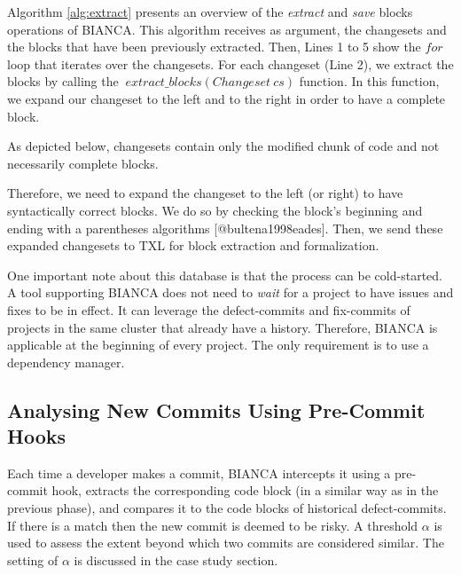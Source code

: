 

Algorithm \ref{alg:extract} presents an overview of the \emph{extract}
and \emph{save} blocks operations of BIANCA. This algorithm receives as
argument, the changesets and the blocks that have been previously
extracted. Then, Lines 1 to 5 show the \(for\) loop that iterates over
the changesets. For each changeset (Line 2), we extract the blocks by
calling the \(~extract\_blocks(Changeset~cs)\) function. In this
function, we expand our changeset to the left and to the right in order
to have a complete block.

As depicted below, changesets contain only the modified chunk of code
and not necessarily complete blocks.

\begin{Shaded}
\begin{Highlighting}[]
\NormalTok{\}}
\NormalTok{\}}
\end{Highlighting}
\end{Shaded}

Therefore, we need to expand the changeset to the left (or right) to
have syntactically correct blocks. We do so by checking the block's
beginning and ending with a parentheses algorithms
{[}@bultena1998eades{]}. Then, we send these expanded changesets to TXL
for block extraction and formalization.

One important note about this database is that the process can be
cold-started. A tool supporting BIANCA does not need to \emph{wait} for
a project to have issues and fixes to be in effect. It can leverage the
defect-commits and fix-commits of projects in the same cluster that
already have a history. Therefore, BIANCA is applicable at the beginning
of every project. The only requirement is to use a dependency manager.

\subsection{Analysing New Commits Using Pre-Commit
Hooks}\label{sec:online}

Each time a developer makes a commit, BIANCA intercepts it using a
pre-commit hook, extracts the corresponding code block (in a similar way
as in the previous phase), and compares it to the code blocks of
historical defect-commits. If there is a match then the new commit is
deemed to be risky. A threshold \(\alpha\) is used to assess the extent
beyond which two commits are considered similar. The setting of
\(\alpha\) is discussed in the case study section.

